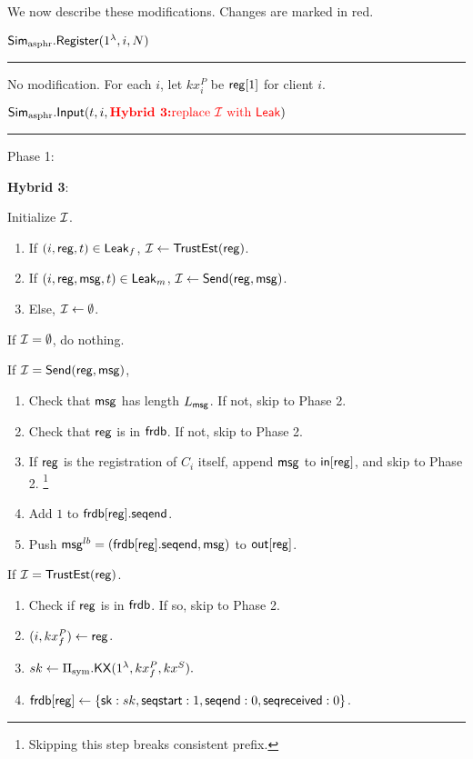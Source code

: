 We now describe these modifications. Changes are marked in red.

\vspace{10pt}

$\mathbf{\mathsf{Sim}_{\text{asphr}}.\mathsf{Register}}(1^{\lambda}, i, N)$
\vspace{5pt}
\hrule
\vspace{5pt}
No modification. For each $i$, let $kx^P_i$ be $\mathsf{reg}[1]$ for client $i$.
\vspace{10pt}

$\mathbf{\mathsf{Sim}_{\text{asphr}}.\mathsf{Input}}(t, i, {\color{red} \textbf{Hybrid 3:} \text{replace $\mathcal{I}$ with $\mathsf{Leak}$}})$
\vspace{5pt}
\hrule
\vspace{5pt}
Phase 1: 

{
\color{red} 

\textbf{Hybrid 3}:

Initialize $\mathcal{I}$.

\begin{enumerate}
    \item If $(i, \mathsf{reg}, t) \in \mathsf{Leak}_f$, $\mathcal{I} \leftarrow \mathsf{TrustEst}(\mathsf{reg})$.
    \item If $(i, \mathsf{reg}, \mathsf{msg}, t) \in \mathsf{Leak}_m$, $\mathcal{I} \leftarrow \mathsf{Send}(\mathsf{reg}, \mathsf{msg})$.
    \item Else, $\mathcal{I} \leftarrow \emptyset$.
\end{enumerate}

}

If $\mathcal{I} = \emptyset$, do nothing. 

If $\mathcal{I} = \mathsf{Send}(\mathsf{reg}, \mathsf{msg})$, 

\begin{enumerate}
    \item Check that $\mathsf{msg}$ has length $L_{\mathsf{msg}}$. If not, skip to Phase 2.
    \item Check that $\mathsf{reg}$ is in $\mathsf{frdb}$. If not, skip to Phase 2.
    \item If $\mathsf{reg}$ is the registration of $C_i$ itself, append $\mathsf{msg}$ to $\mathsf{in}[\mathsf{reg}]$, and skip to Phase 2. \footnote{Skipping this step breaks consistent prefix.}
    \item Add $1$ to $\mathsf{frdb}[\mathsf{reg}].\mathsf{seqend}$. 
    \item Push $\mathsf{msg}^{lb} = (\mathsf{frdb}[\mathsf{reg}].\mathsf{seqend}, \mathsf{msg})$ to $\mathsf{out}[\mathsf{reg}]$.
\end{enumerate}

If $\mathcal{I} = \mathsf{TrustEst}(\mathsf{reg})$.
\begin{enumerate}
    \item Check if $\mathsf{reg}$ is in $\mathsf{frdb}$. If so, skip to Phase 2.
    \item $(i, kx_f^P) \leftarrow \mathsf{reg}$.
    \item $sk \leftarrow \Pi_{\text{sym}}.\mathsf{KX}(1^{\lambda}, kx_f^P, kx^S).$
    \item $\mathsf{frdb}[\mathsf{reg}] \leftarrow \{{\mathsf{sk}}: sk,  \mathsf{seqstart}: 1, \mathsf{seqend}: 0, \mathsf{seqreceived}: 0\}$.
\end{enumerate}

